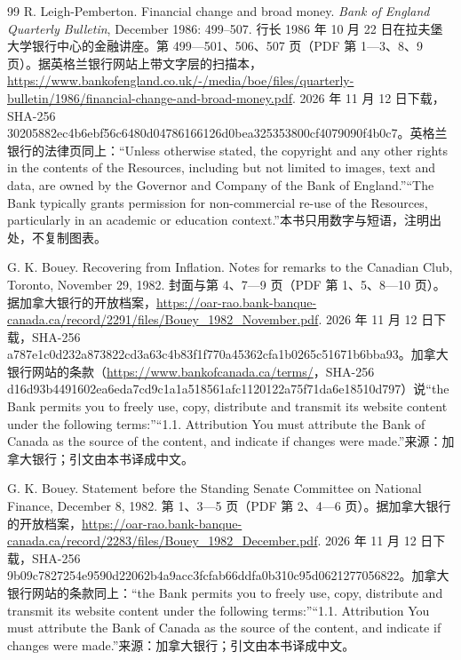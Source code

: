 \begin{thebibliography}{99}
 R. Leigh-Pemberton. Financial change and broad money. \emph{Bank of England Quarterly Bulletin}, December 1986: 499--507. 行长 1986 年 10 月 22 日在拉夫堡大学银行中心的金融讲座。第 499—501、506、507 页（PDF 第 1—3、8、9 页）。据英格兰银行网站上带文字层的扫描本，\url{https://www.bankofengland.co.uk/-/media/boe/files/quarterly-bulletin/1986/financial-change-and-broad-money.pdf}. 2026 年 11 月 12 日下载，SHA-256 30205882ec4b6ebf56c6480d04786166126d0bea325353800cf4079090f4b0c7。英格兰银行的法律页同上：“Unless otherwise stated, the copyright and any other rights in the contents of the Resources, including but not limited to images, text and data, are owned by the Governor and Company of the Bank of England.”“The Bank typically grants permission for non-commercial re-use of the Resources, particularly in an academic or education context.”本书只用数字与短语，注明出处，不复制图表。

 G. K. Bouey. Recovering from Inflation. Notes for remarks to the Canadian Club, Toronto, November 29, 1982. 封面与第 4、7—9 页（PDF 第 1、5、8—10 页）。据加拿大银行的开放档案，\url{https://oar-rao.bank-banque-canada.ca/record/2291/files/Bouey_1982_November.pdf}. 2026 年 11 月 12 日下载，SHA-256 a787e1c0d232a873822cd3a63c4b83f1f770a45362cfa1b0265c51671b6bba93。加拿大银行网站的条款（\url{https://www.bankofcanada.ca/terms/}，SHA-256 d16d93b4491602ea6eda7cd9c1a1a518561afc1120122a75f71da6e18510d797）说“the Bank permits you to freely use, copy, distribute and transmit its website content under the following terms:”“1.1. Attribution You must attribute the Bank of Canada as the source of the content, and indicate if changes were made.”来源：加拿大银行；引文由本书译成中文。

 G. K. Bouey. Statement before the Standing Senate Committee on National Finance, December 8, 1982. 第 1、3—5 页（PDF 第 2、4—6 页）。据加拿大银行的开放档案，\url{https://oar-rao.bank-banque-canada.ca/record/2283/files/Bouey_1982_December.pdf}. 2026 年 11 月 12 日下载，SHA-256 9b09c7827254e9590d22062b4a9acc3fcfab66ddfa0b310c95d0621277056822。加拿大银行网站的条款同上：“the Bank permits you to freely use, copy, distribute and transmit its website content under the following terms:”“1.1. Attribution You must attribute the Bank of Canada as the source of the content, and indicate if changes were made.”来源：加拿大银行；引文由本书译成中文。


\end{thebibliography}
